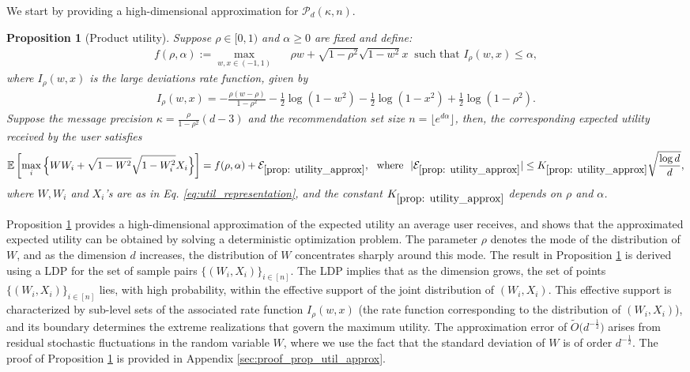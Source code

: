 \documentclass[12pt]{article}
\newtheorem{proposition}[theorem]{Proposition}
\theoremstyle{definition}
\theoremstyle{remark}
\begin{document}
We start by providing a high-dimensional approximation for $\mathcal{P}_d(\kappa,n)$.
\begin{proposition}[Product utility]
\label{prop: utility_approx}
Suppose $\rho \in [0,1)$ and $\alpha \geq 0$ are fixed and define:
\begin{align*}
    f(\rho,\alpha) := \max_{w, x \in (-1,1)} & \ \ \ \rho w + \sqrt{1-\rho^2} \sqrt{1-w^2} x \ \text{ such that } I_{\rho}(w,x) \leq \alpha,
\end{align*}
where $I_{\rho}(w,x)$ is the large deviations rate function, given by
\begin{align}
\label{eq:rate_function}
    I_{\rho}(w,x) = -\frac{\rho(w-\rho)}{1-\rho^2} - \frac{1}{2} \log(1-w^2)-\frac{1}{2} \log(1-x^2) + \frac{1}{2} \log(1-\rho^2).
\end{align}
Suppose the message precision $\kappa = \frac{\rho}{1-\rho^2}(d-3)$ and the recommendation set size $n = \lfloor e^{d\alpha}\rfloor$, then, the corresponding expected utility received by the user satisfies
\begin{align*}
    \mathbb E \left[\max_i \Big\{  W W_i + \sqrt{1-W^2} \sqrt{1-W_i^2} X_i \Big\}\right] = f(\rho,\alpha) + \mathcal{E}_{\ref{prop: utility_approx}}, \ \text{ where }  \ |\mathcal{E}_{\ref{prop: utility_approx}}| \leq K_{\ref{prop: utility_approx}} \sqrt{\frac{\log d}{d}},
\end{align*}
where $W, W_i$ and $X_i$'s are as in Eq. \eqref{eq:util_representation}, and the constant $K_{\ref{prop: utility_approx}}$ depends on $\rho$ and $\alpha$.
\end{proposition}
Proposition \ref{prop: utility_approx} provides a high-dimensional approximation of the expected utility an average user receives, and shows that the approximated expected utility can be obtained by solving a deterministic optimization problem. The parameter $\rho$ denotes the mode of the distribution of $W$, and as the dimension $d$ increases, the distribution of $W$ concentrates sharply around this mode. The result in Proposition \ref{prop: utility_approx} is derived using a LDP for the set of sample pairs $\{(W_i, X_i)\}_{i\in[n]}$. The LDP implies that as the dimension grows, the set of points $\{(W_i, X_i)\}_{i\in[n]}$ lies, with high probability, within the effective support of the joint distribution of $(W_i,X_i)$. This effective support is characterized by sub-level sets of the associated rate function $I_{\rho}(w,x)$ (the rate function corresponding to the distribution of $(W_i, X_i)$), and its boundary determines the extreme realizations that govern the maximum utility. The approximation error of $\tilde{O}\big(d^{-\frac{1}{2}}\big)$ arises from residual stochastic fluctuations in the random variable $W$, where we use the fact that the standard deviation of $W$ is of order $d^{-\frac{1}{2}}$. The proof of Proposition \ref{prop: utility_approx}  is provided in Appendix \ref{sec:proof_prop_util_approx}.
\end{document}
